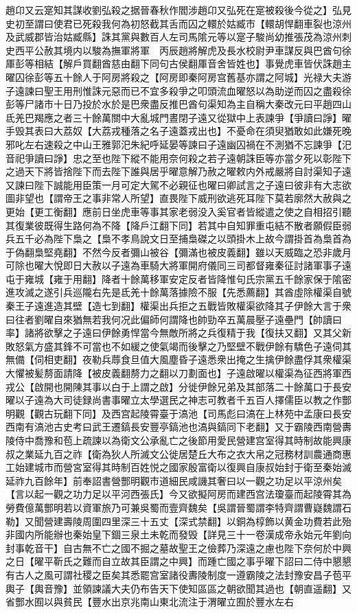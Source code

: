 趙卬又云寔知其謀收劉弘殺之据晉春秋作閻涉趙卬又弘死在寔被殺後今從之】弘見史初至謂曰使君已死殺我何為初怒截其舌而囚之轘於姑臧市【轘胡悍翻車裂也涼州及武威郡皆治姑臧縣】誅其黨與數百人左司馬隂元等以寔子駿尚幼推張茂為涼州刺史西平公赦其境内以駿為撫軍將軍　丙辰趙將解虎及長水校尉尹車謀反與巴酋句徐厙彭等相結【解戶買翻酋慈由翻下同句古侯翻厙音舍皆姓也】事覺虎車皆伏誅趙主曜囚徐彭等五十餘人于阿房將殺之【阿房即秦阿房宫舊基亦謂之阿城】光禄大夫游子遠諫曰聖王用刑惟誅元惡而已不宜多殺爭之叩頭流血曜怒以為助逆而囚之盡殺徐彭等尸諸市十日乃投於水於是巴衆盡反推巴酋句渠知為主自稱大秦改元曰平趙四山氐羌巴羯應之者三十餘萬關中大亂城門晝閉子遠又從獄中上表諫爭【爭讀曰諍】曜手毁其表曰大荔奴【大荔戎種落之名子遠蓋戎出也】不憂命在須臾猶敢如此嫌死晚邪叱左右速殺之中山王雅郭汜朱紀呼延晏等諫曰子遠幽囚禍在不測猶不忘諫爭【汜音祀爭讀曰諍】忠之至也陛下縱不能用奈何殺之若子遠朝誅臣等亦當夕死以彰陛下之過天下將皆捨陛下而去陛下誰與居乎曜意解乃赦之曜敕内外戒嚴將自討渠知子遠又諫曰陛下誠能用臣策一月可定大駕不必親征也曜曰卿試言之子遠曰彼非有大志欲圖非望也【謂帝王之事非常人所望】直畏陛下威刑欲逃死耳陛下莫若廓然大赦與之更始【更工衡翻】應前日坐虎車等事其家老弱没入奚官者皆縱遣之使之自相招引聽其復業彼既得生路何為不降【降戶江翻下同】若其中自知罪重屯結不散者願假臣弱兵五千必為陛下梟之【梟不孝鳥說文日至捕梟磔之以頭掛木上故今謂掛首為梟首為于偽翻梟堅堯翻】不然今反者彌山被谷【彌滿也被皮義翻】雖以天威臨之恐非歲月可除也曜大悅即日大赦以子遠為車騎大將軍開府儀同三司都督雍秦征討諸軍事子遠屯于雍城【雍于用翻】降者十餘萬移軍安定反者皆降惟句氏宗黨五千餘家保于隂密進攻滅之遂引兵巡隴右先是氐羌十餘萬落據險不服【先悉薦翻】其酋虛除權渠自號秦王子遠進造其壁【造七到翻】權渠出兵拒之五戰皆敗權渠欲降其子伊餘大言于衆曰往者劉曜自來猶無若我何况此偏師何謂降也帥勁卒五萬晨壓子遠壘門【帥讀曰率】諸將欲擊之子遠曰伊餘勇悍當今無敵所將之兵復精于我【復扶又翻】又其父新敗怒氣方盛其鋒不可當也不如緩之使氣竭而後擊之乃堅壁不戰伊餘有驕色子遠伺其無備【伺相吏翻】夜勒兵蓐食旦值大風塵昏子遠悉衆出掩之生擒伊餘盡俘其衆權渠大懼被髪剺面請降【被皮義翻剺力之翻以刀劃面也】子遠啟曜以權渠為征西將軍西戎公【啟開也開陳其事以白于上謂之啟】分徙伊餘兄弟及其部落二十餘萬口于長安曜以子遠為大司徒録尚書事曜立太學選民之神志可教者千五百人擇儒臣以教之作酆明觀【觀古玩翻下同】及西宫起陵霄臺于滈池【司馬彪曰滈在上林苑中孟康曰長安西南有滈池古史考曰武王遷鎬長安豐亭鎬池也滈與鎬同下老翻】又于霸陵西南營夀陵侍中喬豫和苞上疏諫以為衛文公承亂亡之後節用愛民營建宫室得其時制故能興康叔之業延九百之祚【衛為狄人所滅文公徙居楚丘大布之衣大帛之冠務材訓農通商惠工始建城市而營宮室得其時制百姓悦之國家殷富衛以復興自康叔始封于衛至秦始滅延祚九百餘年】前奉詔書營酆明觀市道細民咸譏其奢曰以一觀之功足以平涼州矣【言以起一觀之功力足以平河西張氏】今又欲擬阿房而建西宫法瓊臺而起陵霄其為勞費億萬酆明若以資軍旅乃可兼吳蜀而壹齊魏矣【吳謂晉蜀謂李特齊謂曹嶷魏謂石勒】又聞營建壽陵周圍四里深三十五丈【深式禁翻】以銅為椁飾以黄金功費若此殆非國内所能辦也秦始皇下錮三泉土未乾而發毁【詳見三十一卷漢成帝永始元年劉向封事乾音干】自古無不亡之國不掘之墓故聖王之儉葬乃深遠之慮也陛下奈何於中興之日【曜平靳氏之難而自立故其臣謂之中興】而踵亡國之事乎曜下詔曰二侍中懇懇有古人之風可謂社稷之臣矣其悉罷宫室諸役夀陵制度一遵霸陵之法封豫安昌子苞平輿子【輿音豫】並領諫議大夫仍布告天下使知區區之朝欲聞其過也【朝直遥翻】又省酆水囿以與貧民【豐水出京兆南山東北流注于渭曜立囿於豐水左右